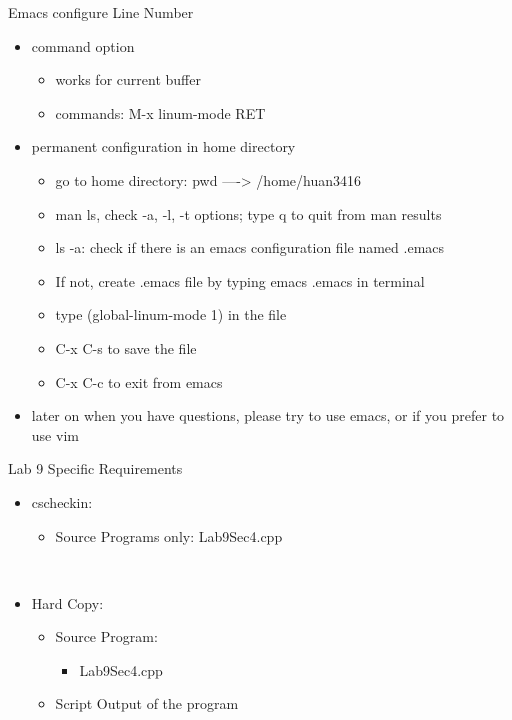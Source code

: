 \documentclass[presentation]{beamer}
\begin{document}
\begin{frame}[label=sec-7]{Emacs configure \alert{Line Number}}
\begin{itemize}
\item command option
\begin{itemize}
\item works for current buffer
\item commands: \alert{M-x linum-mode RET}
\end{itemize}
\item permanent configuration in home directory
\begin{itemize}
\item go to home directory: \alert{pwd} ----> \alert{/home/huan3416}
\item \alert{man ls}, check \alert{-a}, \alert{-l}, \alert{-t} options; type \alert{q} to quit from \alert{man} results
\item \alert{ls -a}: check if there is an emacs configuration file named \alert{.emacs}
\item If not, create \alert{.emacs} file by typing \alert{emacs .emacs} in terminal
\item type \alert{(global-linum-mode 1)} in the file
\item \alert{C-x C-s} to \alert{save} the file
\item \alert{C-x C-c} to \alert{exit} from emacs
\end{itemize}
\item later on when you have questions, please try to use \alert{emacs}, or if you prefer to use \alert{vim}
\end{itemize}
\end{frame}

\begin{frame}[label=sec-8]{Lab 9 Specific Requirements}
\begin{itemize}
\item \alert{cscheckin}:
\begin{itemize}
\item \alert{Source Programs} only: \alert{Lab9Sec4.cpp}
\end{itemize}
\end{itemize}
\\
\begin{itemize}
\item \alert{Hard Copy}:
\begin{itemize}
\item \alert{Source Program}: 
\begin{itemize}
\item Lab9Sec4.cpp
\end{itemize}
\item \alert{Script Output} of the program
\end{itemize}
\end{itemize}
\end{frame}
\end{document}
